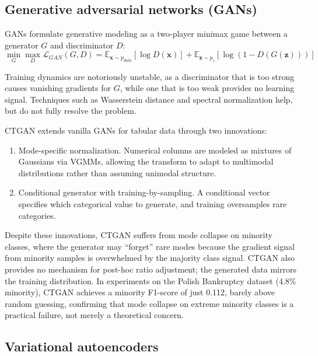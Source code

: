 \subsection{Generative adversarial networks (GANs)}

GANs \cite{goodfellow2014gan} formulate generative modeling as a two-player minimax game between a generator $G$ and discriminator $D$:
\begin{equation}
\min_G \max_D \mathcal{L}_{GAN}(G, D) = \mathbb{E}_{\mathbf{x} \sim p_{data}}[\log D(\mathbf{x})] + \mathbb{E}_{\mathbf{z} \sim p_z}[\log(1 - D(G(\mathbf{z})))]
\end{equation}

Training dynamics are notoriously unstable, as a discriminator that is too strong causes vanishing gradients for $G$, while one that is too weak provides no learning signal. Techniques such as Wasserstein distance \cite{arjovsky2017wgan} and spectral normalization help, but do not fully resolve the problem.

CTGAN \cite{xu2019ctgan} extends vanilla GANs for tabular data through two innovations:
\begin{enumerate}
    \item Mode-specific normalization. Numerical columns are modeled as mixtures of Gaussians via VGMMs, allowing the transform to adapt to multimodal distributions rather than assuming unimodal structure.

    \item Conditional generator with training-by-sampling. A conditional vector specifies which categorical value to generate, and training oversamples rare categories.
\end{enumerate}

Despite these innovations, CTGAN suffers from mode collapse on minority classes, where the generator may ``forget'' rare modes because the gradient signal from minority samples is overwhelmed by the majority class signal. CTGAN also provides no mechanism for post-hoc ratio adjustment; the generated data mirrors the training distribution. In experiments on the Polish Bankruptcy dataset (4.8\% minority), CTGAN achieves a minority F1-score of just 0.112, barely above random guessing, confirming that mode collapse on extreme minority classes is a practical failure, not merely a theoretical concern.

\subsection{Variational autoencoders}

